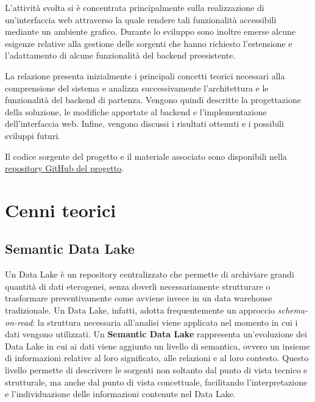 \documentclass[13.6pt,a4paper]{report}
\begin{document}
\noindent
L'attività svolta si è concentrata principalmente sulla realizzazione di un'interfaccia web attraverso la quale rendere tali funzionalità accessibili mediante un ambiente grafico. Durante lo sviluppo sono inoltre emerse alcune esigenze relative alla gestione delle sorgenti che hanno richiesto l'estensione e l'adattamento di alcune funzionalità del backend preesistente.

\noindent
La relazione presenta inizialmente i principali concetti teorici necessari alla comprensione del sistema e analizza successivamente l'architettura e le funzionalità del backend di partenza. Vengono quindi descritte la progettazione della soluzione, le modifiche apportate al backend e l'implementazione dell'interfaccia web. Infine, vengono discussi i risultati ottenuti e i possibili sviluppi futuri.

\noindent
Il codice sorgente del progetto e il materiale associato sono disponibili nella
\href{https://github.com/Parents99/Datalake-ui_NGD.git}{repository GitHub del progetto}.

\chapter{Cenni teorici}

\section{Semantic Data Lake}

Un Data Lake è un repository centralizzato che permette di archiviare grandi quantità di dati eterogenei, senza doverli necessariamente strutturare o trasformare preventivamente come avviene invece in un data warehouse tradizionale.
Un Data Lake, infatti, adotta frequentemente un approccio \textit{schema-on-read}: la struttura necessaria all’analisi viene applicata nel momento in cui i dati vengono utilizzati.
\noindent
Un \textbf{Semantic Data Lake} rappresenta un'evoluzione dei Data Lake in cui ai dati viene aggiunto un livello di semantica, ovvero un insieme di informazioni relative al loro significato, alle relazioni e al loro contesto.
\noindent
Questo livello permette di descrivere le sorgenti non soltanto dal punto di vista tecnico e strutturale, ma anche dal punto di vista concettuale, facilitando l'interpretazione e l'individuazione delle informazioni contenute nel Data Lake.
\end{document}
